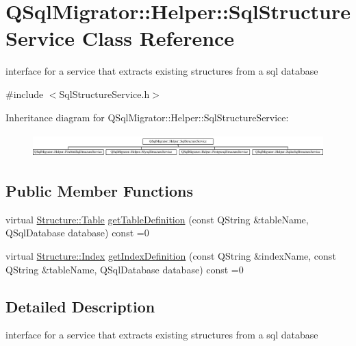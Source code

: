 \hypertarget{class_q_sql_migrator_1_1_helper_1_1_sql_structure_service}{}\section{Q\+Sql\+Migrator\+:\+:Helper\+:\+:Sql\+Structure\+Service Class Reference}
\label{class_q_sql_migrator_1_1_helper_1_1_sql_structure_service}


interface for a service that extracts existing structures from a sql database  




{\ttfamily \#include $<$Sql\+Structure\+Service.\+h$>$}

Inheritance diagram for Q\+Sql\+Migrator\+:\+:Helper\+:\+:Sql\+Structure\+Service\+:\begin{figure}[H]
\begin{center}
\leavevmode
\includegraphics[height=0.924092cm]{class_q_sql_migrator_1_1_helper_1_1_sql_structure_service}
\end{center}
\end{figure}
\subsection*{Public Member Functions}
\begin{DoxyCompactItemize}
\item 
virtual \hyperlink{class_q_sql_migrator_1_1_structure_1_1_table}{Structure\+::\+Table} \hyperlink{class_q_sql_migrator_1_1_helper_1_1_sql_structure_service_abb2f11402700c1a1e52d596431255e8a}{get\+Table\+Definition} (const Q\+String \&table\+Name, Q\+Sql\+Database database) const =0
\item 
virtual \hyperlink{class_q_sql_migrator_1_1_structure_1_1_index}{Structure\+::\+Index} \hyperlink{class_q_sql_migrator_1_1_helper_1_1_sql_structure_service_ab62049f95710fc0965097f08b410e790}{get\+Index\+Definition} (const Q\+String \&index\+Name, const Q\+String \&table\+Name, Q\+Sql\+Database database) const =0
\end{DoxyCompactItemize}


\subsection{Detailed Description}
interface for a service that extracts existing structures from a sql database 

